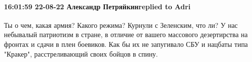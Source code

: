  
 
 
 
 

\paragraph{16:01:59 22-08-22 Александр Петряйкинreplied to Adri}

Ты о чем, какая армия? Какого режима? Курнули с Зеленским, что ли? У нас
небывалый патриотизм в стране, в отличие от вашего массового дезертирства на
фронтах и сдачи в плен боевиков. Как бы их не запугивало СБУ и нацбаты типа
"Кракер", расстреливающий своих бойцов в спину.

